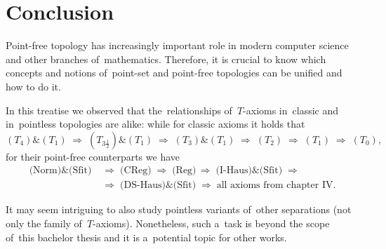 \chapter*{Conclusion}

Point-free topology has increasingly important role in modern computer science
and other branches of~mathematics.
Therefore, it is crucial to know which concepts and notions of~point-set and
point-free topologies can be unified and how to do it.

In this treatise we observed that the~relationships of~$T$-axioms in~classic
and in~pointless topologies are alike:
while for classic axioms it holds that
\[
  (T_4) \& (T_1)
  \; \Longrightarrow \; (T_{3\frac{1}{2}}) \& (T_1)
  \; \Longrightarrow \; (T_3) \& (T_1)
  \; \Longrightarrow \; (T_2)
  \; \Longrightarrow \; (T_1)
  \; \Longrightarrow \; (T_0),
\]
for their point-free counterparts we have
\begin{align*}
  \text{(Norm)} \& \text{(Sfit)}
  \; &\Rightarrow \; \text{(CReg)}
  \; \Rightarrow \; \text{(Reg)}
  \, \Rightarrow \; \text{(I-Haus)} \& \text{(Sfit)}
  \; \Rightarrow \\
  \; &\Rightarrow \; \text{(DS-Haus)} \& \text{(Sfit)}
  \; \Rightarrow \; \text{all axioms from chapter IV}.
\end{align*}

It may seem intriguing to also study pointless variants of~other separations
(not only the family of~$T$-axioms).
Nonetheless, such a~task is beyond the scope of~this bachelor thesis and it is
a~potential topic for other works.
